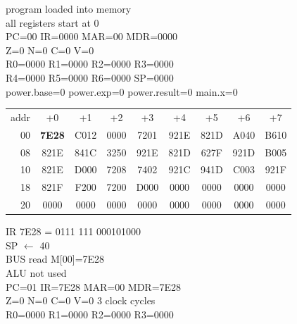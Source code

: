 \noindent\begin{tcolorbox}[stepbox, title={Step 0 \hfill starting state}]
\textcolor{dim}{program loaded into memory}\\
\textcolor{dim}{all registers start at 0}\\
PC=00 IR=0000 MAR=00 MDR=0000\\
Z=0 N=0 C=0 V=0\\
R0=0000 R1=0000 R2=0000 R3=0000\\
R4=0000 R5=0000 R6=0000 SP=0000\\
\textcolor{dim}{power.base=0  power.exp=0  power.result=0  main.x=0}\\[1pt]
{\setlength{\tabcolsep}{1.6pt}\begin{tabular}{@{}r*{8}{c}@{}}
\textcolor{dim}{addr} & \textcolor{dim}{+0} & \textcolor{dim}{+1} & \textcolor{dim}{+2} & \textcolor{dim}{+3} & \textcolor{dim}{+4} & \textcolor{dim}{+5} & \textcolor{dim}{+6} & \textcolor{dim}{+7}\\
\textcolor{dim}{00} & \cellcolor{pcc}\textbf{7E28} & C012 & 0000 & 7201 & 921E & 821D & A040 & B610\\
\textcolor{dim}{08} & 821E & 841C & 3250 & 921E & 821D & 627F & 921D & B005\\
\textcolor{dim}{10} & 821E & D000 & 7208 & 7402 & 921C & 941D & C003 & 921F\\
\textcolor{dim}{18} & 821F & F200 & 7200 & D000 & \cellcolor{datac}0000 & \cellcolor{datac}0000 & \cellcolor{datac}0000 & \cellcolor{datac}0000\\
\textcolor{dim}{20} & \cellcolor{stackc}0000 & \cellcolor{stackc}0000 & \cellcolor{stackc}0000 & \cellcolor{stackc}0000 & \cellcolor{stackc}0000 & \cellcolor{stackc}0000 & \cellcolor{stackc}0000 & \cellcolor{stackc}0000\\
\end{tabular}}
\end{tcolorbox}\hfill\begin{tcolorbox}[stepbox, title={Step 1 \hfill PC 00 \quad LI SP, 40}]
\textcolor{dim}{IR} 7E28 = 0111 111 000101000\\
SP $\leftarrow$ 40\\
\textcolor{dim}{BUS} read M[00]=7E28\\
\textcolor{dim}{ALU} \textcolor{dim}{not used}\\
PC=01 IR=7E28 MAR=00 MDR=7E28\\
Z=0 N=0 C=0 V=0 \hfill \textcolor{dim}{3 clock cycles}\\
R0=0000 R1=0000 R2=0000 R3=0000\\

\end{tcolorbox}

